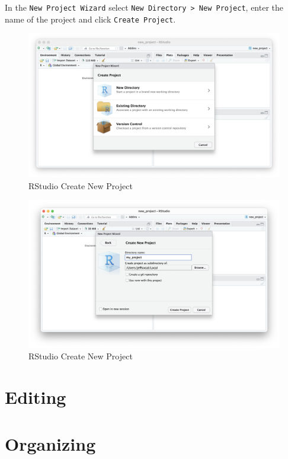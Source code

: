 \documentclass[
]{book}
\begin{document}
In the \texttt{New\ Project\ Wizard} select \texttt{New\ Directory\ \textgreater{}\ New\ Project}, enter the name of the project and click \texttt{Create\ Project}.

\begin{figure}
\includegraphics[width=30.72in]{images/03_021_new_project_01} \caption{\label{fig:3201}RStudio Create New Project}\label{fig:3201}
\end{figure}
\begin{figure}
\includegraphics[width=31.94in]{images/03_021_new_project_02} \caption{\label{fig:3202}RStudio Create New Project}\label{fig:3202}
\end{figure}

\hypertarget{editing}{%
\section{Editing}\label{editing}}

\hypertarget{organizing}{%
\section{Organizing}\label{organizing}}
\end{document}
